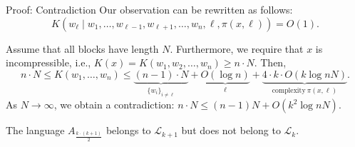 \documentclass[aspectratio=169]{beamer}
\begin{document}
\begin{frame}{Proof: Contradiction}
    Our observation can be rewritten as follows:
    \[
    K(w_\ell \mid w_1,\dots,w_{\ell-1},w_{\ell+1},\dotsc,w_n,\ell,\pi(x,\ell)) = O(1).
    \]

    Assume that all blocks have length $N$. Furthermore, we require that $x$ is incompressible, i.e., $K(x) = K(w_1,w_2,\dotsc,w_n) \ge n \cdot N$.
    Then,
    \[
    n \cdot N \le K(w_1,\dotsc,w_n) \le
    \underbrace{(n-1) \cdot N}_{\{w_i\}_{i \neq \ell}} +
    \underbrace{O(\log n)}_{\ell} +
    \underbrace{4 \cdot k \cdot O(k \log n N)}_{\text{complexity}\ \pi(x,\ell)}.
    \]
    As $N \to \infty$, we obtain a contradiction: $n \cdot N \le (n-1)N + O(k^2 \log n N)$.\medskip

The language $A_{\frac{k \cdot (k + 1)}{2}}$ belongs to $\mathcal{L}_{k+1}$ but does not belong to $\mathcal{L}_k$.

\end{frame}
\end{document}
